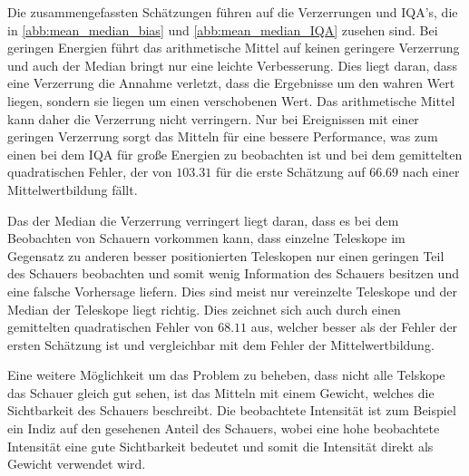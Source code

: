 Die zusammengefassten Schätzungen führen auf die Verzerrungen und IQA's, die in \autoref{abb:mean_median_bias} und \autoref{abb:mean_median_IQA} zusehen sind.
Bei geringen Energien führt das arithmetische Mittel auf keinen geringere Verzerrung und auch der Median bringt nur eine leichte Verbesserung.
Dies liegt daran, dass eine Verzerrung die Annahme verletzt, dass die Ergebnisse um den wahren Wert liegen, sondern sie liegen um einen verschobenen
Wert.
Das arithmetische Mittel kann daher die Verzerrung nicht verringern.
Nur bei Ereignissen mit einer geringen Verzerrung sorgt das Mitteln für eine bessere Performance, was zum einen bei dem IQA für große Energien zu beobachten
ist und bei dem gemittelten quadratischen Fehler, der von $\num{103.31}$ für die erste Schätzung auf $\num{66.69}$ nach einer Mittelwertbildung fällt.

Das der Median die Verzerrung verringert liegt daran, dass es bei dem Beobachten von Schauern vorkommen kann, dass einzelne Teleskope im Gegensatz zu anderen
besser positionierten Teleskopen nur einen geringen Teil des Schauers beobachten und somit wenig Information des Schauers besitzen und eine falsche Vorhersage
liefern.
Dies sind meist nur vereinzelte Teleskope und der Median der Teleskope liegt richtig.
Dies zeichnet sich auch durch einen gemittelten quadratischen Fehler von $\num{68.11}$ aus, welcher besser als der Fehler der ersten Schätzung ist und
vergleichbar mit dem Fehler der Mittelwertbildung.

Eine weitere Möglichkeit um das Problem zu beheben, dass nicht alle Telskope das Schauer gleich gut sehen, ist das Mitteln mit einem Gewicht, welches die
Sichtbarkeit des Schauers beschreibt.
Die beobachtete Intensität ist zum Beispiel ein Indiz auf den gesehenen Anteil des Schauers, wobei eine hohe
beobachtete Intensität eine gute Sichtbarkeit bedeutet und somit die Intensität direkt als Gewicht verwendet wird.

